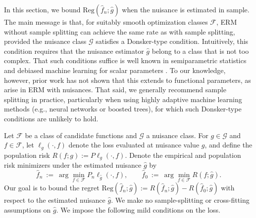\documentclass[11pt]{article}
\newcommand{\Reg}{\mathrm{Reg}}
\theoremstyle{plain}
\theoremstyle{definition} %
\begin{document}
In this section, we bound \(\Reg(\hat f_n;\hat g)\) when the nuisance is
estimated in sample. The main message is that, for suitably smooth
optimization classes \(\mathcal F\), ERM without sample splitting can achieve
the same rate as with sample splitting, provided the nuisance class
\(\mathcal G\) satisfies a Donsker-type condition.  Intuitively, this
condition requires that the nuisance estimator \(\hat g\) belong to a class
that is not too complex. That such conditions
suffice is well known in semiparametric statistics and debiased machine
learning for scalar parameters \citep{van2007empirical}. To our knowledge, however, prior work has not
shown that this extends to functional parameters, as arise in ERM with nuisances. That said, we generally recommend sample splitting in practice,
particularly when using highly adaptive machine learning methods (e.g., neural
networks or boosted trees), for which such Donsker-type conditions are
unlikely to hold.

Let \(\mathcal{F}\) be a class of candidate functions and \(\mathcal{G}\) a
nuisance class. For \(g\in\mathcal{G}\) and \(f\in\mathcal{F}\), let
\(\ell_g(\cdot,f)\) denote the loss evaluated at nuisance value \(g\), and
define the population risk \(R(f;g):=P\ell_g(\cdot,f)\). Denote the empirical
and population risk minimizers under the estimated nuisance \(\hat g\) by
\[
\hat f_n \ :=\ \arg\min_{f\in\mathcal{F}} P_n \ell_{\hat g}(\cdot, f),
\qquad
\hat f_0 \ :=\ \arg\min_{f\in\mathcal{F}} R(f;\hat g).
\]
Our goal is to bound the regret \(\Reg(\hat f_n;\hat g):=R(\hat f_n;\hat g)-R(\hat f_0;\hat g)\)
with respect to the estimated nuisance \(\hat g\). We make no sample-splitting
or cross-fitting assumptions on \(\hat g\). We impose the following mild conditions on the loss.
\end{document}
